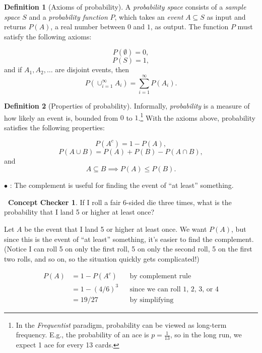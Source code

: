 \documentclass[12pt,oneside]{article}
\newcommand{\tip}{\textbf{\faLightbulb}: }
\theoremstyle{definition}
\newtheorem{definition}{Definition}
\newtheorem{concept}{\faPen \ Concept Checker}
\theoremstyle{remark}
\begin{document}
\begin{definition}[Axioms of probability]
A \textit{probability space} consists of a \textit{sample space} $S$ and a \textit{probability function} $P$, which takes an \textit{event} $A \subseteq S$ as input and returns $P(A)$, a real number between $0$ and $1$, as output. The function $P$ must satisfy the following axioms: 

\[P(\emptyset) = 0,\] \[P(S) = 1,\] and if $A_1, A_2, \ldots$ are disjoint events, then \[P \left( \cup_{i = 1}^{\infty} A_i \right) = \sum_{i = 1}^{\infty} P(A_i).\]
\end{definition}

\begin{definition}[Properties of probability]
Informally, \textit{probability} is a measure of how likely an event is, bounded from $0$ to $1$.\footnote{In the \textit{Frequentist} paradigm, probability can be viewed as long-term frequency. E.g., the probability of an ace is $p = \frac{1}{13}$, so in the long run, we expect 1 ace for every 13 cards.} With the axioms above, probability satisfies the following properties:

\[P(A^c) = 1 - P(A),\] \[P(A \cup B) = P(A) + P(B) - P(A \cap B),\] and \[A \subseteq B \implies P(A) \leq P(B).\]

$\bullet$ \tip The complement is useful for finding the event of \enquote{at least} something.
\end{definition}

\begin{concept}
If I roll a fair 6-sided die three times, what is the probability that I land 5 or higher at least once?
\end{concept}

\begin{solutionbox}
Let $A$ be the event that I land 5 or higher at least once. We want $P(A)$, but since this is the event of \enquote{at least} something, it's easier to find the complement. (Notice I can roll 5 on only the first roll, 5 on only the second roll, 5 on the first two rolls, and so on, so the situation quickly gets complicated!)

\[
\begin{aligned}
P(A) &= 1 - P(A^c) && \text{by complement rule} \\
&= 1 - (4/6)^3 && \text{since we can roll 1, 2, 3, or 4} \\
&= 19/27 && \text{by simplifying}
\end{aligned}
\]
\end{solutionbox}
\end{document}
